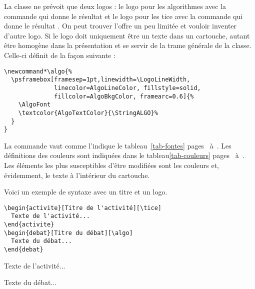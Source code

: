 \documentclass[nocrop]{sesamanuel}
\begin{document}
La classe ne prévoit que deux logos\label{logos} : le logo pour les
algorithmes avec la commande  qui donne le résultat \algo{}
et le logo pour les tice avec la commande  qui donne le
résultat \tice. On peut trouver l'offre un peu limitée et vouloir
inventer d'autre logo. Si le logo doit uniquement être un texte dans
un cartouche, autant être homogène dans la présentation et se servir
de la trame générale de la classe. Celle-ci définit  de la
façon suivante :
\begin{verbatim}
\newcommand*\algo{%
  \psframebox[framesep=1pt,linewidth=\LogoLineWidth,
              linecolor=AlgoLineColor, fillstyle=solid,
              fillcolor=AlgoBkgColor, framearc=0.6]{%
    \AlgoFont
    \textcolor{AlgoTextColor}{\StringALGO}%
  }
}
\end{verbatim}
\clearpage
La commande  vaut
 comme
l'indique le tableau~\ref{tab-fontes} pages~\pageref{tab-debut-fontes}
à~\pageref{tab-fontes}. Les définitions des couleurs sont indiquées
dans le tableau\ref{tab-couleurs} pages~\pageref{tab-debut-couleur}
à~\pageref{tab-couleurs}. Les éléments les plus susceptibles d'être
modifiées sont les couleurs et, évidemment, le texte à l'intérieur du
cartouche.

Voici un exemple de syntaxe avec un titre et un logo.

\begin{code}
\begin{verbatim}
\begin{activite}[Titre de l'activité][\tice]
  Texte de l'activité...
\end{activite}
\begin{debat}[Titre du débat][\algo]
  Texte du débat...
\end{debat}
\end{verbatim}
\end{code}
\begin{result}
 
\end{result}
\begin{activite}
  Texte de l'activité...
\end{activite}
\begin{debat}
  Texte du débat...
\end{debat}
\end{document}
